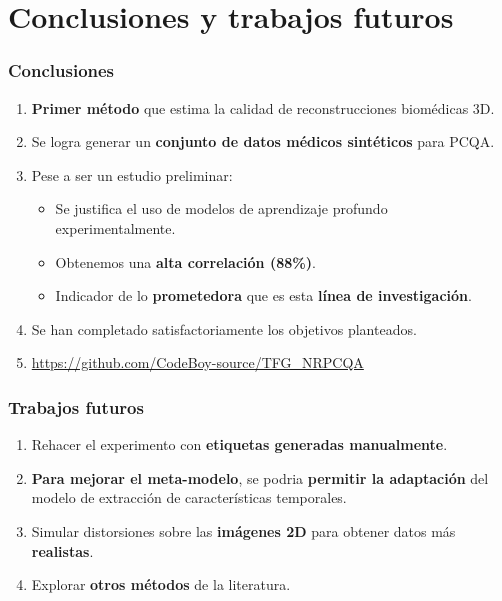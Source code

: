 \section{Conclusiones y trabajos futuros}
\begin{frame}
  \frametitle{Conclusiones}
  \begin{enumerate}
    \item \textbf{Primer método} que estima la calidad de reconstrucciones biomédicas 3D.
    \item Se logra generar un \textbf{conjunto de datos médicos sintéticos } para PCQA.
    \item Pese a ser un estudio preliminar: 
      \begin{itemize}
        \item Se justifica el uso de modelos de aprendizaje profundo experimentalmente.
        \item Obtenemos una \textbf{alta correlación (88\%)}. 
        \item Indicador de lo \textbf{prometedora} que es esta \textbf{línea de investigación}.
      \end{itemize}
    \item Se han completado satisfactoriamente los objetivos planteados.
    \item \url{https://github.com/CodeBoy-source/TFG_NRPCQA} 
  \end{enumerate}
\end{frame}

\begin{frame}
  \frametitle{Trabajos futuros}
  \begin{enumerate}
    \item Rehacer el experimento con \textbf{etiquetas generadas manualmente}. 
    \item \textbf{Para mejorar el meta-modelo}, se podria \textbf{permitir la adaptación} del modelo de extracción de características temporales.
    \item Simular distorsiones sobre las \textbf{imágenes 2D} para obtener datos más \textbf{realistas}.
    \item Explorar \textbf{otros métodos} de la literatura. 
  \end{enumerate}
\end{frame}
